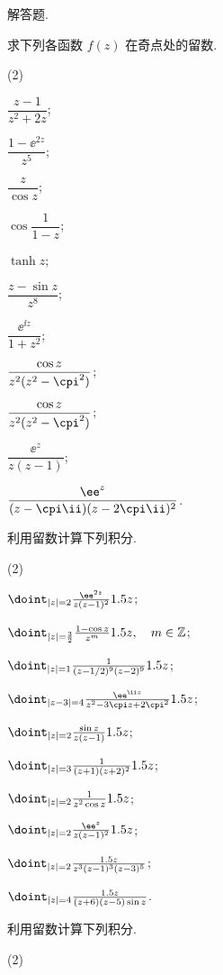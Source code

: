 \begin{homework}
  \item 解答题.
  \begin{homework}
    \item 求下列各函数 $f(z)$ 在奇点处的留数.
      \begin{subhomework}(2)
        \item $\dfrac{z-1}{z^2+2z}$;
        \item $\dfrac{1-\ee^{2z}}{z^5}$;
        \item $\dfrac z{\cos z}$;
        \item $\cos\dfrac1{1-z}$;
        \item $\tanh z$;
        \item $\dfrac{z-\sin z}{z^8}$;
        \item $\dfrac{\ee^{\ii z}}{1+z^2}$;
        \item $\dfrac{\cos z}{z^2(z^2-\cpi^2)}$;
        \item $\dfrac{\cos z}{z^2(z^2-\cpi^2)}$;
        \item $\dfrac{\ee^z}{z(z-1)}$;
        \item $\dfrac{\ee^z}{(z-\cpi\ii)(z-2\cpi\ii)^2}$.
      \end{subhomework}
    \item 利用留数计算下列积分.
    \begin{subhomework}(2)
    \item $\doint_{\abs{z}=2}\frac{\ee^{2z}}{z(z-1)^2}\d z$;
    \item $\doint_{\abs{z}=\frac32}\frac{1-\cos z}{z^m}\d z,\quad m\in\BZ$;
    \item $\doint_{\abs{z}=1}\frac1{(z-1/2)^9(z-2)^9}\d z$;
    \item $\doint_{\abs{z-3}=4}\frac{\ee^{\ii z}}{z^2-3\cpi z+2\cpi^2}\d z$;
    \item $\doint_{\abs{z}=2}\frac{\sin z}{z(z-1)}\d z$;
    \item $\doint_{\abs{z}=3}\frac{1}{(z+1)(z+2)^2}\d z$;
    \item $\doint_{\abs{z}=2}\frac1{z^2\cos z}\d z$;
    \item $\doint_{\abs{z}=2}\frac{\ee^z}{z(z-1)^2}\d z$;
    \item $\doint_{\abs{z}=2}\frac{\d z}{z^3(z-1)^3(z-3)^5}$;
    \item $\doint_{\abs{z}=4}\frac{\d z}{(z+6)(z-5)\sin z}$.
    \end{subhomework}
    \item 利用留数计算下列积分.
    \begin{subhomework}(2)

\end{subhomework}
\end{homework}
\end{homework}
